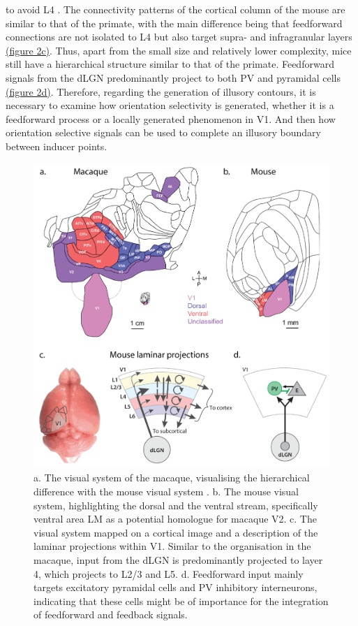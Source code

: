 \documentclass[12pt]{article}
\begin{document}
to avoid L4 \autocite{rocklandWhatWeKnow2019}. The connectivity patterns of the cortical column of the mouse are similar to that of the primate, with the main difference being that feedforward connections are not isolated to L4 but also target supra- and infragranular layers \hyperref[fig:Laminar_Figure]{(figure 2c)}. Thus, apart from the small size and relatively lower complexity, mice still have a hierarchical structure similar to that of the primate. Feedforward signals from the dLGN predominantly project to both PV and pyramidal cells \hyperref[fig:Laminar_Figure]{(figure 2d)}. Therefore, regarding the generation of illusory contours, it is necessary to examine how orientation selectivity is generated, whether it is a feedforward process or a locally generated phenomenon in V1. And then how orientation selective signals can be used to complete an illusory boundary between inducer points. 

\begin{figure}[H]
  \centering
  \includegraphics[width=1.0 \textwidth]{adjusted_figures/Laminar_Figure.png}
  \caption{a. The visual system of the macaque, visualising the hierarchical difference with the mouse visual system \autocite{gamanutAnatomicalFunctionalConnectomes2022}. b. The mouse visual system, highlighting the dorsal and the ventral stream, specifically ventral area LM as a potential homologue for macaque V2. c. The visual system mapped on a cortical image and a description of the laminar projections within V1. Similar to the organisation in the macaque, input from the dLGN is predominantly projected to layer 4, which projects to L2/3 and L5. d. Feedforward input mainly targets excitatory pyramidal cells and PV inhibitory interneurons, indicating that these cells might be of importance for the integration of feedforward and feedback signals.
  \autocite{niellHowCorticalCircuits2021}}
  \label{fig:Laminar_Figure}
\end{figure}
\end{document}
